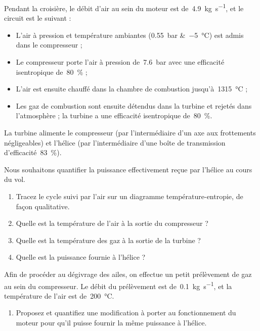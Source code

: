 	Pendant la croisière, le débit d’air au sein du moteur est de~\SI{4,9}{\kilogram\per\second}, et le circuit est le suivant :
	\begin{itemize}
		\item L’air à pression et température ambiantes (\SI{0,55}{\bar} \&~\SI{-5}{\degreeCelsius}) est admis dans le compresseur ;
		\item Le compresseur porte l’air à pression de~\SI{7,6}{\bar} avec une efficacité isentropique de~\SI{80}{\percent} ;
		\item L’air est ensuite chauffé dans la chambre de combustion jusqu’à~\SI{1315}{\degreeCelsius} ;
		\item Les gaz de combustion sont ensuite détendus dans la turbine et rejetés dans l’atmosphère ; la turbine a une efficacité isentropique de~\SI{80}{\percent}.
	\end{itemize}
	
	 La turbine alimente le compresseur (par l’intermédiaire d’un axe aux frottements négligeables) et l’hélice (par l’intermédiaire d’une boîte de transmission d’efficacité~\SI{83}{\percent}).
	
	Nous souhaitons quantifier la puissance effectivement reçue par l’hélice au cours du vol.
	
	\begin{enumerate}
		\item Tracez le cycle suivi par l’air sur un diagramme température-entropie, de façon qualitative.
		\item Quelle est la température de l’air à la sortie du compresseur ?
		\item Quelle est la température des gaz à la sortie de la turbine ?
		\item Quelle est la puissance fournie à l’hélice ?
	\end{enumerate}

	Afin de procéder au dégivrage des ailes, on effectue un petit prélèvement de gaz au sein du compresseur. Le débit du prélèvement est de~\SI{0,1}{\kilogram\per\second}, et la température de l’air est de~\SI{200}{\degreeCelsius}.
	
	\begin{enumerate}
		\item Proposez et quantifiez une modification à porter au fonctionnement du moteur pour qu’il puisse fournir la même puissance à l’hélice.
	\end{enumerate}
	
